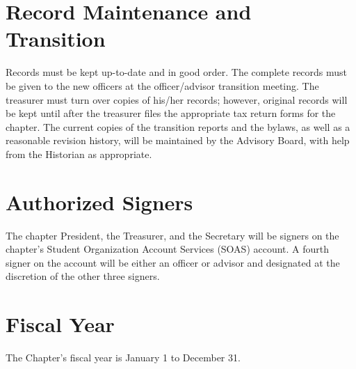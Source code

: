 \section{Record Maintenance and Transition} Records must be kept up-to-date and in good order. The complete records must be given  to the new officers at the officer/advisor transition meeting. The treasurer must turn over copies of his/her records; however, original records will be kept until after the treasurer files the appropriate tax return forms for the chapter. The current copies of the transition reports and the bylaws, as well as a reasonable revision history, will be maintained by the Advisory Board, with help from the Historian as appropriate.
\section{Authorized Signers} %
 The chapter President, the Treasurer, and the Secretary will be signers on the chapter's Student Organization Account Services (SOAS) account. A fourth signer on the account will be either an officer or advisor and designated at the discretion of the other three signers.  
\section{Fiscal Year} The Chapter's fiscal year is January 1 to December 31.
